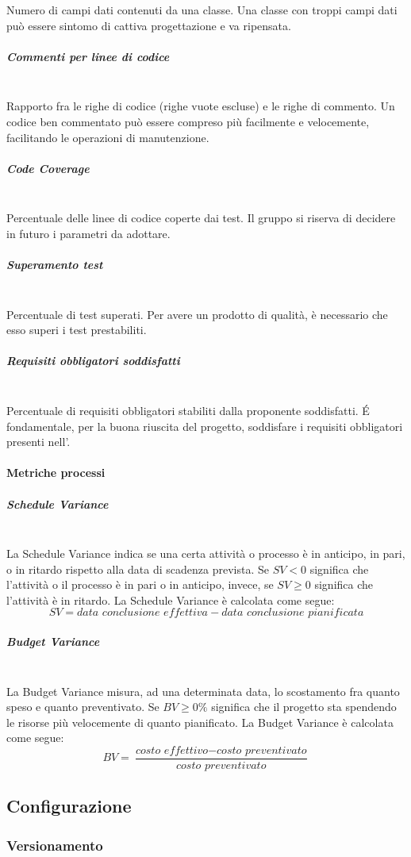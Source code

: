 Numero di campi dati contenuti da una classe. Una classe con troppi campi dati può essere sintomo di cattiva progettazione e va ripensata.
\subparagraph{Commenti per linee di codice}\mbox{}\\
Rapporto fra le righe di codice (righe vuote escluse) e le righe di commento. Un codice ben commentato può essere compreso più facilmente e velocemente, facilitando le operazioni di manutenzione.
\subparagraph{Code Coverage}\mbox{}\\
Percentuale delle linee di codice coperte dai test.
Il gruppo \gruppo \space si riserva di decidere in futuro i parametri da adottare.
\subparagraph{Superamento test}\mbox{}\\
Percentuale di test superati. Per avere un prodotto di qualità, è necessario che esso superi i test prestabiliti.
\subparagraph{Requisiti obbligatori soddisfatti}\mbox{}\\
Percentuale di requisiti obbligatori stabiliti dalla proponente soddisfatti. \'E fondamentale, per la buona riuscita del progetto, soddisfare i requisiti obbligatori presenti nell'\AdR .
	
\paragraph{Metriche processi}\mbox{}
\subparagraph{Schedule Variance}\mbox{}\\
La Schedule Variance indica se una certa attività o processo è in anticipo, in pari, o in ritardo rispetto alla data di scadenza prevista.
Se $SV < 0$ significa che l'attività o il processo è in pari o in anticipo, invece, se $SV \geq 0$ significa che l'attività è in ritardo.
La Schedule Variance è calcolata come segue:
\[
SV = \textit{data conclusione effettiva} - \textit{data conclusione pianificata}
\]
\subparagraph{Budget Variance}\mbox{}\\
La Budget Variance misura, ad una determinata data, lo scostamento fra quanto speso e quanto preventivato. Se $BV \geq 0\%$ significa che il progetto sta spendendo le risorse più velocemente di quanto pianificato.
La Budget Variance è calcolata come segue:
\[
BV = \frac{\textit{costo effettivo} - \textit{costo preventivato}}{\textit{costo preventivato}}
\]


\subsection{Configurazione}
\subsubsection{Versionamento}

